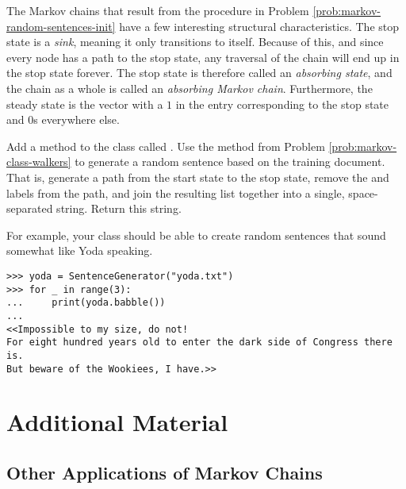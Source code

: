 \begin{info} %
The Markov chains that result from the procedure in Problem \ref{prob:markov-random-sentences-init} have a few interesting structural characteristics.
The stop state is a \emph{sink}, meaning it only transitions to itself.
Because of this, and since every node has a path to the stop state, any traversal of the chain will end up in the stop state forever.
The stop state is therefore called an \emph{absorbing state}, and the chain as a whole is called an \emph{absorbing Markov chain}.
Furthermore, the steady state is the vector with a $1$ in the entry corresponding to the stop state and $0$s everywhere else.
\end{info}

\begin{problem} %
\label{prob:markov-random-sentences-babble}
Add a method to the  class called .
Use the  method from Problem \ref{prob:markov-class-walkers} to generate a random sentence based on the training document.
That is, generate a path from the start state to the stop state, remove the  and  labels from the path, and join the resulting list together into a single, space-separated string. Return this string.

For example, your  class should be able to create random sentences that sound somewhat like Yoda speaking.

\begin{lstlisting}
>>> yoda = SentenceGenerator("yoda.txt")
>>> for _ in range(3):
... 	print(yoda.babble())
...
<<Impossible to my size, do not!
For eight hundred years old to enter the dark side of Congress there is.
But beware of the Wookiees, I have.>>
\end{lstlisting}
\end{problem}

\newpage

\section*{Additional Material} %

\subsection*{Other Applications of Markov Chains} %

